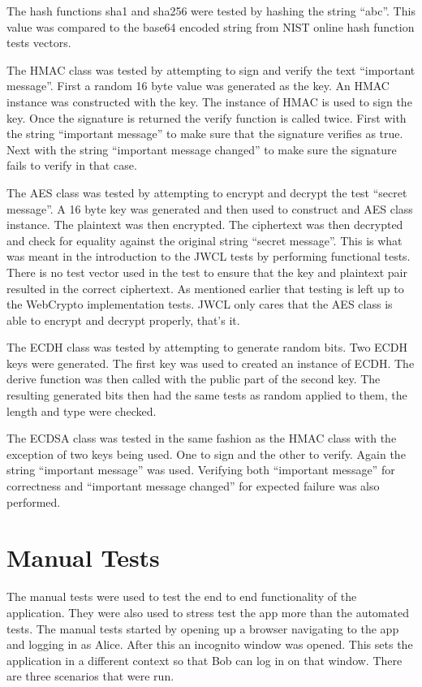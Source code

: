The hash functions sha1 and sha256 were tested by hashing the string “abc”. This value was compared to the base64 encoded string from NIST online hash function tests vectors.\cite{test-vectors}


The HMAC class was tested by attempting to sign and verify the text “important message”. First a random 16 byte value was generated as the key. An HMAC instance was constructed with the key. The instance of HMAC is used to sign the key. Once the signature is returned the verify function is called twice. First with the string “important message” to make sure that the signature verifies as true. Next with the string “important message changed” to make sure the signature fails to verify in that case.


The AES class was tested by attempting to encrypt and decrypt the test “secret message”. A 16 byte key was generated and then used to construct and AES class instance. The plaintext was then encrypted. The ciphertext was then decrypted and check for equality against the original string “secret message”. This is what was meant in the introduction to the JWCL tests by performing functional tests. There is no test vector used in the test to ensure that the key and plaintext pair resulted in the correct ciphertext. As mentioned earlier that testing is left up to the WebCrypto implementation tests. JWCL only cares that the AES class is able to encrypt and decrypt properly, that's it.


The ECDH class was tested by attempting to generate random bits. Two ECDH keys were generated. The first key was used to created an instance of ECDH. The derive function was then called with the public part of the second key. The resulting generated bits then had the same tests as random applied to them, the length and type were checked.


The ECDSA class was tested in the same fashion as the HMAC class with the exception of two keys being used. One to sign and the other to verify. Again the string “important message” was used. Verifying both “important message” for correctness and “important message changed” for expected failure was also performed. 


\section{Manual Tests}


The manual tests were used to test the end to end functionality of the application. They were also used to stress test the app more than the automated tests. The manual tests started by opening up a browser navigating to the app and logging in as Alice. After this an incognito window was opened. This sets the application in a different context so that Bob can log in on that window. There are three scenarios that were run.


